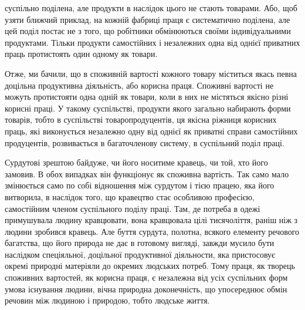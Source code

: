\parcont{}  %
суспільно поділена, але продукти в наслідок цього не стають товарами.
Або, щоб узяти ближчий приклад, на кожній фабриці
праця є систематично поділена, але цей поділ постає не з того,
що робітники обмінюються своїми індивідуальними продуктами.
Тільки продукти самостійних і незалежних одна від однієї приватних
праць протистоять один одному як товари.

Отже, ми бачили, що в споживній вартості кожного товару
міститься якась певна доцільна продуктивна діяльність, або корисна
праця. Споживні вартості не можуть протистояти одна
одній як товари, коли в них не містяться якісно різні корисні
праці. У такому суспільстві, продукти якого загально набирають
форми товарів, тобто в суспільстві товаропродуцентів, ця якісна
ріжниця корисних праць, які виконується незалежно одну від
однієї як приватні справи самостійних продуцентів, розвивається
в багаточленову систему, в суспільний поділ праці.

Сурдутові зрештою байдуже, чи його носитиме кравець, чи
той, хто його замовив. В обох випадках він функціонує як споживна
вартість. Так само мало змінюється само по собі відношення
між сурдутом і тією працею, яка його витворила, в наслідок
того, що кравецтво стає особливою професією, самостійним
членом суспільного поділу праці. Там, де потреба в одежі примушувала
людину кравцювати, вона кравцювала цілі тисячоліття,
раніш ніж з людини зробився кравець. Але буття сурдута,
полотна, всякого елементу речового багатства, що його природа
не дає в готовому вигляді, завжди мусило бути наслідком спеціяльної,
доцільної продуктивної діяльности, яка пристосовує окремі
природні матеріяли до окремих людських потреб. Тому праця,
як творець споживних вартостей, як корисна праця, є незалежна
від усіх суспільних форм умова існування людини, вічна природна
доконечність, що упосереднює обмін речовин між людиною і природою,
тобто людське життя.

